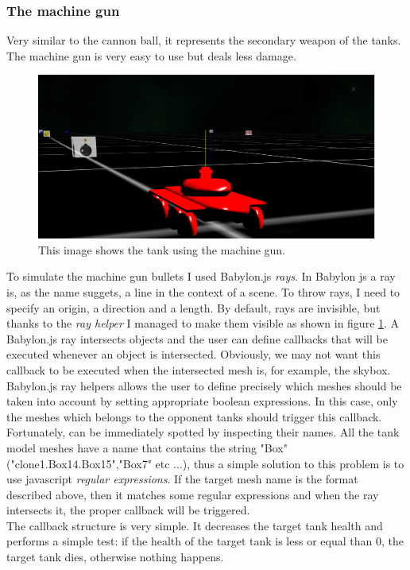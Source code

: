 \documentclass[14pt]{article}
\begin{document}
\subsubsection{The machine gun}
Very similar to the cannon ball, it represents the secondary weapon of the tanks. The machine gun is very easy to use but deals less damage. \\



\begin{figure}[H]
\includegraphics[width=12cm]{images/machineGun.png}
\caption{This image shows the tank using the machine gun.}
\label{img:machineGun}
\end{figure}

To simulate the machine gun bullets I used Babylon.js \textit{rays}. In Babylon js a ray is, as the name suggets, a line in the context of a scene. To throw rays, I need to specify an origin, a direction and a length. By default, rays are invisible, but thanks to the \textit{ray helper} I managed to make them visible as shown in figure  \ref{img:machineGun}. A Babylon.js ray intersects objects and the user can define callbacks that will be executed whenever an object is intersected. Obviously, we may not want this callback to be executed when the intersected mesh is, for example, the skybox. Babylon.js ray helpers allows the user to define precisely which meshes should be taken into account by setting appropriate boolean expressions. In this case, only the meshes which belongs to the opponent tanks should trigger this callback. Fortunately, can be immediately spotted by inspecting their names. All the tank model meshes have a name that contains the string "Box" ("clone\textunderscore 1.Box14.Box15","Box7" etc ...), thus a simple solution to this problem is to use javascript \textit{regular expressions}. If the target mesh name is the format described above, then it matches some regular expressions and when the ray intersects it, the proper callback will be triggered. \\
The callback structure is very simple. It decreases the target tank health and performs a simple test: if the health of the target tank is less or equal than 0, the target tank dies, otherwise nothing happens.
\end{document}
